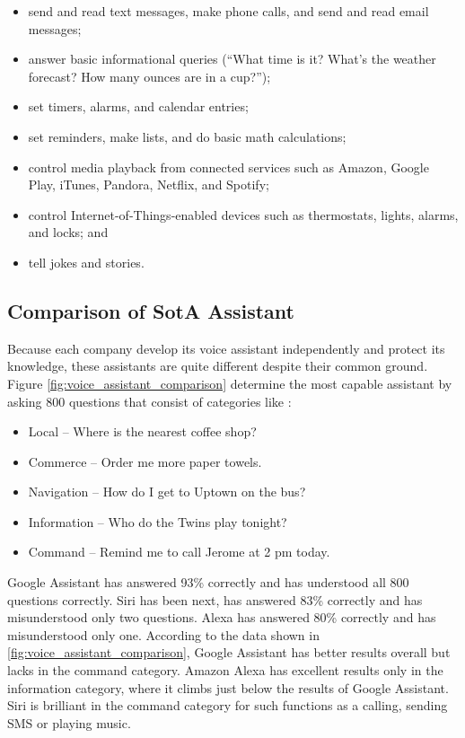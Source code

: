 \begin{itemize}
    \item send and read text messages, make phone calls, and send and read email messages; 
    \item answer basic informational queries (“What time is it? What’s the weather forecast? How many ounces are in a cup?”); 
    \item set timers, alarms, and calendar entries;
    \item set reminders, make lists, and do basic math calculations;
    \item control media playback from connected services such as Amazon, Google Play, iTunes, Pandora, Netflix, and Spotify; 
    \item control  Internet-of-Things-enabled  devices  such  as  thermostats,  lights, alarms, and locks; and 
    \item tell jokes and stories. 
\end{itemize}

\subsection{Comparison of SotA Assistant}

Because each company develop its voice assistant independently and protect its knowledge, these assistants are quite different despite their common ground. Figure \cref{fig:voice_assistant_comparison} determine the most capable assistant by asking 800 questions that consist of categories like \citep{voice_assistant_comparison_munster_2019}:

\begin{itemize}
    \item Local – Where is the nearest coffee shop?
    \item Commerce – Order me more paper towels.
    \item Navigation – How do I get to Uptown on the bus?
    \item Information – Who do the Twins play tonight?
    \item Command – Remind me to call Jerome at 2 pm today.
\end{itemize}

Google Assistant has answered 93\% correctly and has understood all 800 questions correctly. Siri has been next, has answered 83\% correctly and has misunderstood only two questions. Alexa has answered 80\% correctly and has misunderstood only one. According to the data shown in \cref{fig:voice_assistant_comparison}, Google Assistant has better results overall but lacks in the command category. Amazon Alexa has excellent results only in the information category, where it climbs just below the results of Google Assistant. Siri is brilliant in the command category for such functions as a calling, sending SMS or playing music.

